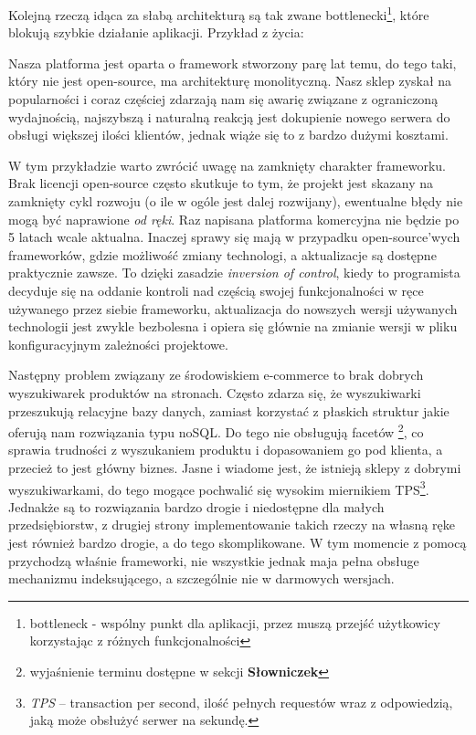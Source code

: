 Kolejną rzeczą idąca za słabą architekturą są tak zwane bottlenecki\footnote{bottleneck - wspólny punkt dla aplikacji, przez muszą przejść użytkowicy korzystając z różnych funkcjonalności}, które blokują szybkie działanie aplikacji. Przykład z życia: 
\begin{example}
	Nasza platforma jest oparta o framework stworzony parę lat temu, do tego taki, który nie jest open-source, ma architekturę monolityczną. Nasz sklep zyskał na popularności i coraz częściej zdarzają nam się awarię związane z ograniczoną wydajnością, najszybszą i naturalną reakcją jest dokupienie nowego serwera do obsługi większej ilości klientów, jednak wiąże się to z bardzo dużymi kosztami.
\end{example} 
W tym przykładzie warto zwrócić uwagę na zamknięty charakter frameworku. Brak licencji open-source często skutkuje to tym, że projekt jest skazany na zamknięty cykl rozwoju (o ile w ogóle jest dalej rozwijany), ewentualne błędy nie mogą być naprawione \textit{od ręki}. Raz napisana platforma komercyjna nie będzie po 5 latach wcale aktualna. Inaczej sprawy się mają w przypadku open-source'wych frameworków, gdzie możliwość zmiany technologi, a aktualizacje są dostępne praktycznie zawsze. To dzięki zasadzie \textit{inversion of control}, kiedy to programista decyduje się na oddanie kontroli nad częścią swojej funkcjonalności w ręce używanego przez siebie frameworku, aktualizacja do nowszych wersji używanych technologii jest zwykle bezbolesna i opiera się głównie na zmianie wersji w pliku konfiguracyjnym zależności projektowe.

Następny problem związany ze środowiskiem e-commerce to brak dobrych wyszukiwarek produktów na stronach. Często zdarza się, że wyszukiwarki przeszukują relacyjne bazy danych, zamiast korzystać z płaskich struktur jakie oferują nam rozwiązania typu noSQL. Do tego nie obsługują facetów \footnote{wyjaśnienie terminu dostępne w sekcji \textbf{Słowniczek}}, co sprawia trudności z wyszukaniem produktu i dopasowaniem go pod klienta, a przecież to jest główny biznes. Jasne i wiadome jest, że istnieją sklepy z dobrymi wyszukiwarkami, do tego mogące pochwalić się wysokim miernikiem TPS\footnote{\textit{TPS} -- transaction per second, ilość pełnych requestów wraz z odpowiedzią, jaką może obsłużyć serwer na sekundę.}. Jednakże są to rozwiązania bardzo drogie i niedostępne dla małych przedsiębiorstw, z drugiej strony implementowanie takich rzeczy na własną ręke jest również bardzo drogie, a do tego skomplikowane. W tym momencie z pomocą przychodzą właśnie frameworki, nie wszystkie jednak maja pełna obsługe mechanizmu indeksującego, a szczególnie nie w darmowych wersjach.

